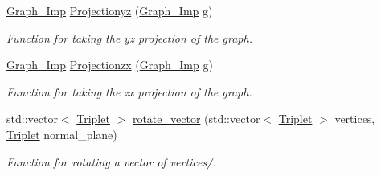 \begin{DoxyCompactItemize}
\mbox{\hyperlink{class_graph___imp}{Graph\+\_\+\+Imp}} \mbox{\hyperlink{class_three___d__to___two___d_a88bc95eea0f7a0cb4c4a97b7aead1d6d}{Projectionyz}} (\mbox{\hyperlink{class_graph___imp}{Graph\+\_\+\+Imp}} g)
\begin{DoxyCompactList}\small\item\em Function for taking the yz projection of the graph. \end{DoxyCompactList}\item 
\mbox{\hyperlink{class_graph___imp}{Graph\+\_\+\+Imp}} \mbox{\hyperlink{class_three___d__to___two___d_ac45147c0fe25318b89d14114b6956834}{Projectionzx}} (\mbox{\hyperlink{class_graph___imp}{Graph\+\_\+\+Imp}} g)
\begin{DoxyCompactList}\small\item\em Function for taking the zx projection of the graph. \end{DoxyCompactList}\item 
std\+::vector$<$ \mbox{\hyperlink{struct_triplet}{Triplet}} $>$ \mbox{\hyperlink{class_three___d__to___two___d_a59038023694a3c5e9c87a1483b712f48}{rotate\+\_\+vector}} (std\+::vector$<$ \mbox{\hyperlink{struct_triplet}{Triplet}} $>$ vertices, \mbox{\hyperlink{struct_triplet}{Triplet}} normal\+\_\+plane)
\begin{DoxyCompactList}\small\item\em Function for rotating a vector of vertices/. \end{DoxyCompactList}\end{DoxyCompactItemize}

